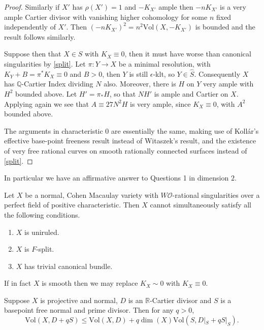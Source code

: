 \documentclass[a4paper,12pt]{book}
\newcommand{\Vol}{\text{Vol}}
\begin{document}
\begin{proof}
		Similarly if $X'$ has $\rho(X')=1$ and $-K_{X'}$ ample then $-nK_{X'}$ is a very ample Cartier divisor with vanishing higher cohomology for some $n$ fixed independently of $X'$. Then $(-nK_{X'})^{2}=n^{2}\Vol(X,-K_{X'})$ is bounded and the result follows similarly.
		
		Suppose then that $X \in S$ with $K_{X} \equiv 0$, then it must have worse than canonical singularities by \autoref{split}. Let $\pi\colon Y \to X$ be a minimal resolution, with $K_{Y}+B=\pi^{*}K_{X} \equiv 0$ and $B >0$, then $Y$ is still $\epsilon$-klt, so $Y \in \hat{S}$. Consequently $X$ has $\mathbb{Q}$-Cartier Index dividing $N$ also. Moreover, there is $H$ on $Y$ very ample with $H^{2}$ bounded above. Let $H'=\pi_{*}H$, so that $NH'$ is ample and Cartier on $X$. Applying \cite[Theorem 4.1]{witaszek2015effective} again we see that $A\equiv 27N^{2}H$ is very ample, since $K_{X}\equiv 0$, with $A^{2}$ bounded above.
		
		The arguments in characteristic $0$ are essentially the same, making use of Koll{\'a}r's effective base-point freeness result \cite[Theorem 1.1, Lemma 1.2]{kollar1993effective} instead of Witaszek's result, and the existence of very free rational curves on smooth rationally connected surfaces instead of \autoref{split}.
	\end{proof}

\begin{remark}
	In particular we have an affirmative answer to Questions 1 in dimension $2$.
\end{remark}

\begin{theorem}\cite[Theorem 1.2]{patakfalvi2019ordinary}\label{split}
	Let $X$ be a normal, Cohen Macaulay variety with $W\mathcal{O}$-rational singularities over a perfect field of positive characteristic. Then $X$ cannot simultaneously satisfy all the following conditions.
	\begin{enumerate}
		\item $X$ is uniruled.
		\item $X$ is $F$-split.
		\item $X$ has trivial canonical bundle.
	\end{enumerate}
	If in fact $X$ is smooth then we may replace $K_{X}\sim 0$ with $K_{X} \equiv 0$.
\end{theorem}

\begin{lemma}\label{vol}\cite[Lemma 2.5]{jiang2018birational}
	Suppose $X$ is projective and normal, $D$ is an $\mathbb{R}$-Cartier divisor and $S$ is a basepoint free normal and prime divisor. Then for any $q >0$,
	\[\Vol(X,D+qS) \leq \Vol(X,D) + q\dim(X)\Vol(S,D|_{S}+qS|_{S}).\]
\end{lemma}	
\end{document}
